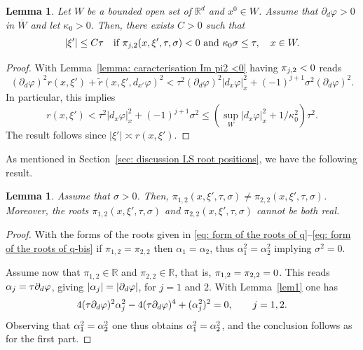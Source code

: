 \documentclass[10pt]{amsart}
\theoremstyle{plain}
\newtheorem{lemma}[theorem]{Lemma}
\theoremstyle{definition}
\def\R{\mathbb{R}}
\let\k\kappa
\let \Re \relax
\DeclareMathOperator{\Re}{Re}
\let \Im \relax
\DeclareMathOperator{\Im}{Im}
\newcommand{\ovl}[1]{\overline{#1}}
\begin{document}
\begin{lemma}
\label{lemma: low frequency caracterisation}
Let $W$ be a bounded open set of $\R^d$ and $x^0 \in W$. Assume that
$\partial_d \varphi>0$ in $\ovl{W}$ and let $\k_0>0$. Then, there exists $C>0$ such
that
\begin{equation*}
|\xi'| \leq C \tau \quad
\text{if} \ \Im \pi_{j,2} (x,\xi', \tau,\sigma) <0
\ \text{and}\ \k_0 \sigma \leq \tau, \quad x\in W.
\end{equation*}
\end{lemma}

\begin{proof}
With Lemma~\ref{lemma: caracterisation Im pi2 <0} having $\Im
\pi_{j,2} <0$ reads
\begin{equation*}
(\partial_d\varphi)^2r(x,\xi')+\tilde{r}(x,\xi',d_{x'}\varphi)^2
<\tau^2(\partial_d\varphi)^2|d_x\varphi|_x^2+(-1)^{j+1}\sigma^2(\partial_d\varphi)^2.
\end{equation*}
In particular,
this implies
\begin{equation*}
r(x,\xi') <\tau^2 |d_x\varphi|_x^2+(-1)^{j+1}\sigma^2
\leq (\sup_W |d_x\varphi|_x^2 + 1/\k_0^2) \tau^2.
\end{equation*}
The result follows since $|\xi'| \asymp r(x,\xi')$.
\end{proof}

As mentioned in Section~\ref{sec: discussion LS root positions}, we
have the following result.

\begin{lemma}
\label{lemma: no real double root}
Assume that $\sigma >0$. Then,
$\pi_{1,2} (x,\xi',\tau,\sigma)\neq \pi_{2,2} (x,\xi',\tau,\sigma)$. Moreover, the roots $\pi_{1,2} (x,\xi',\tau,\sigma) $ and $\pi_{2,2} (x,\xi',\tau,\sigma)$ cannot be both real.
\end{lemma}

\begin{proof}
With the forms of the roots given in \eqref{eq: form of the roots of q}--\eqref{eq: form of the
roots of q-bis} if $\pi_{1,2}=\pi_{2,2}$ then $\alpha_1 = \alpha_2$, thus
$\alpha_1^2 = \alpha_2^2$ implying $\sigma^2=0$.

Assume now that $\pi_{1,2} \in \R$ and $\pi_{2,2}\in \R$, that is,
$\Im \pi_{1,2} = \Im \pi_{2,2}=0$. This reads $\Re \alpha_j = \tau
\partial_d \varphi$, giving
$|\Re \alpha_j| = |\partial_d \varphi|$, for $j=1$ and $2$. With Lemma~\ref{lem1} one
has
\begin{equation*}
4 (\tau \partial_d\varphi)^2 \Re \alpha_j^2-4 (\tau \partial_d\varphi)^4+(\Im
\alpha_j^2)^2 =0,\qquad j=1,2.
\end{equation*}
Observing that $\Im \alpha_1^2 = \Im \alpha_2^2$ one thus obtains
$\Re \alpha_1^2 = \Re \alpha_2^2$,
and the conclusion follows as for the first part.
\end{proof}
\end{document}
